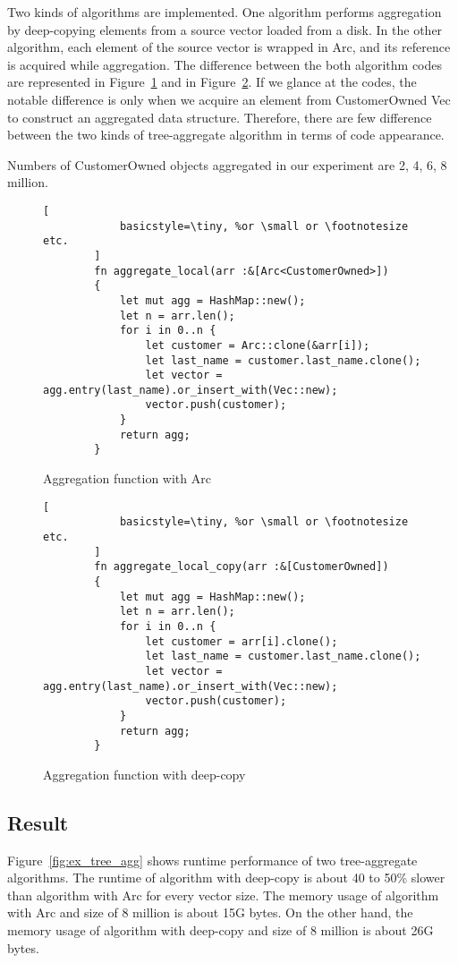 Two kinds of algorithms are implemented. One algorithm performs aggregation by deep-copying elements from a source vector loaded from a disk. 
In the other algorithm, each element of the source vector is wrapped in Arc, and its reference is acquired while aggregation. 
The difference between the both algorithm codes are represented in Figure~\ref{fig:arc_tree} and in Figure~\ref{fig:deep_tree}.
If we glance at the codes, the notable difference is only when we acquire an element from CustomerOwned Vec to construct an aggregated data structure.
Therefore, there are few difference between the two kinds of tree-aggregate algorithm in terms of code appearance.

Numbers of CustomerOwned objects aggregated in our experiment are 2, 4, 6, 8 million. 

\begin{figure}[htb]
    \begin{lstlisting}[
            basicstyle=\tiny, %or \small or \footnotesize etc.
        ]
        fn aggregate_local(arr :&[Arc<CustomerOwned>]) 
        {   
            let mut agg = HashMap::new();
            let n = arr.len();
            for i in 0..n {
                let customer = Arc::clone(&arr[i]);
                let last_name = customer.last_name.clone();
                let vector = agg.entry(last_name).or_insert_with(Vec::new);
                vector.push(customer);
            }
            return agg;
        }
    \end{lstlisting}
    \caption{Aggregation function with Arc}
    \label{fig:arc_tree}
\end{figure}


\begin{figure}[htb]
    \begin{lstlisting}[
            basicstyle=\tiny, %or \small or \footnotesize etc.
        ]
        fn aggregate_local_copy(arr :&[CustomerOwned]) 
        {   
            let mut agg = HashMap::new();
            let n = arr.len();
            for i in 0..n {
                let customer = arr[i].clone();
                let last_name = customer.last_name.clone();
                let vector = agg.entry(last_name).or_insert_with(Vec::new);
                vector.push(customer);
            }
            return agg;
        }
    \end{lstlisting}
    \caption{Aggregation function with deep-copy}
    \label{fig:deep_tree}
\end{figure}


\subsection{Result}
Figure~\ref{fig:ex_tree_agg} shows runtime performance of two tree-aggregate algorithms. 
The runtime of algorithm with deep-copy is about 40 to 50\% slower than algorithm with Arc for every vector size. 
The memory usage of algorithm with Arc and size of 8 million is about 15G bytes. On the other hand, 
the memory usage of algorithm with deep-copy and size of 8 million is about 26G bytes.

